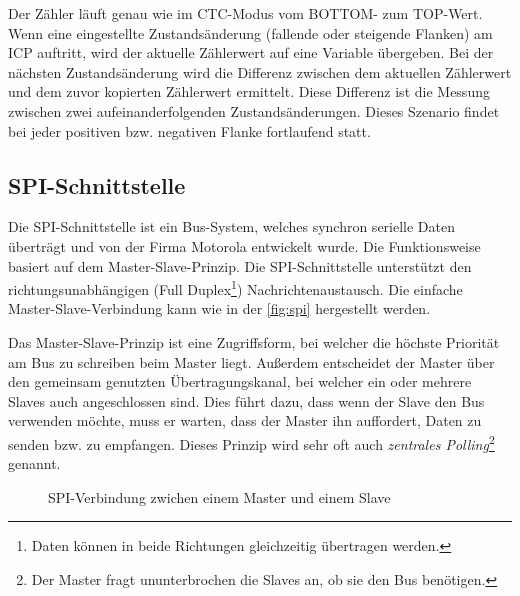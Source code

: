Der Zähler läuft genau wie im CTC-Modus vom BOTTOM- zum TOP-Wert. Wenn eine eingestellte Zustandsänderung (fallende oder steigende Flanken) am ICP auftritt, wird der aktuelle Zählerwert auf eine Variable übergeben. Bei der nächsten Zustandsänderung wird die Differenz zwischen dem aktuellen Zählerwert und dem zuvor kopierten Zählerwert ermittelt. Diese Differenz ist die Messung zwischen zwei aufeinanderfolgenden Zustandsänderungen. Dieses Szenario findet bei jeder positiven bzw. negativen Flanke fortlaufend statt. 

\subsection{SPI-Schnittstelle}

Die SPI-Schnittstelle ist ein Bus-System, welches synchron serielle Daten überträgt und von der Firma Motorola entwickelt wurde. Die Funktionsweise basiert auf dem Master-Slave-Prinzip. Die SPI-Schnittstelle unterstützt den richtungsunabhängigen (Full Duplex\footnote{Daten können in beide Richtungen gleichzeitig übertragen werden.}) Nachrichtenaustausch. Die einfache Master-Slave-Verbindung kann wie in der \autoref{fig:spi} hergestellt werden. \smallskip \smallskip

Das Master-Slave-Prinzip ist eine Zugriffsform, bei welcher die höchste Priorität am Bus zu schreiben beim Master liegt. Außerdem entscheidet der Master über den gemeinsam genutzten Übertragungskanal, bei welcher ein oder mehrere Slaves auch angeschlossen sind. Dies führt dazu, dass wenn der Slave den Bus verwenden möchte, muss er warten, dass der Master ihn auffordert, Daten zu senden bzw. zu empfangen. Dieses Prinzip wird sehr oft auch \textit{zentrales Polling}\footnote{Der Master fragt ununterbrochen die Slaves an, ob sie den Bus benötigen.} genannt. \smallskip \smallskip

\begin{figure}[htbp]
	\centering
	\caption{SPI-Verbindung zwichen einem Master und einem Slave}\label{fig:spi}
\end{figure}

